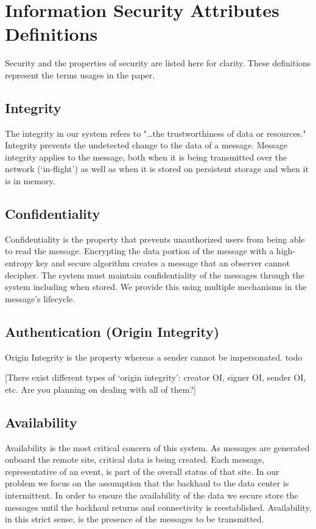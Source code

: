 \section{Information Security Attributes Definitions}
Security and the properties of security are listed here for clarity. These definitions represent the terms usages in the paper.
\subsection{Integrity}
The integrity in our system refers to "\ldots the trustworthiness of data or resources."
\cite{Bishop:2003ug} Integrity prevents the undetected change to the data of a message. Message integrity applies to the message, both when it is being transmitted over the network (‘in-flight’)  as well as when it is stored on persistent storage and when it is in memory.\cite{Levinson:2010wm}
\subsection{Confidentiality}
Confidentiality is the property that prevents unauthorized users from being able to read the message. Encrypting the data portion of the message with a high-entropy key and secure algorithm creates a message that an observer cannot decipher. The system must maintain confidentiality of the messages through the system including when stored. We provide this using multiple mechanisms in the message’s lifecycle. 
\subsection{Authentication (Origin Integrity)}
Origin Integrity is the property whereas a sender cannot be impersonated. todo 


[There exist different types of ‘origin integrity’: creator OI, signer OI, sender OI, etc. Are you planning on dealing with all of them?]


\subsection{Availability} 
Availability is the most critical concern of this system. As messages are generated onboard the remote site, critical data is being created. Each message, representative of an event, is part of the overall status of that site. In our problem we focus on the assumption that the backhaul to the data center is intermittent. In order to ensure the availability of the data we secure store the messages until the backhaul returns and connectivity is reestablished. Availability, in this strict sense, is the presence of the messages to be transmitted.
